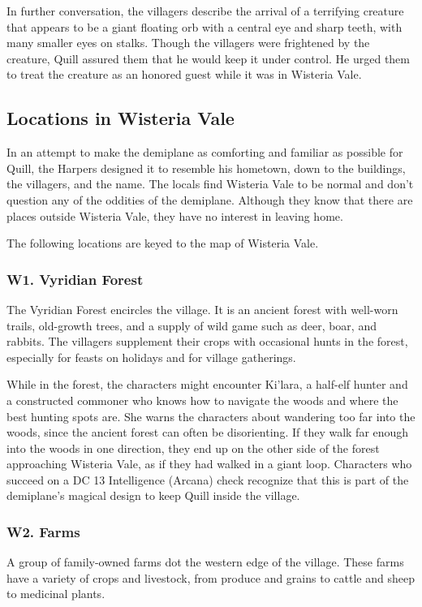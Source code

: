 \documentclass[10pt,a4paper,twoside,bg=print,twocolumn,openany,nodeprecatedcode]{dndbook}
\begin{document}
In further conversation, the villagers describe the arrival of a terrifying creature that appears to be a giant floating orb with a central eye and sharp teeth, with many smaller eyes on stalks. Though the villagers were frightened by the creature, Quill assured them that he would keep it under control. He urged them to treat the creature as an honored guest while it was in Wisteria Vale.

\subsection{Locations in Wisteria Vale}
In an attempt to make the demiplane as comforting and familiar as possible for Quill, the Harpers designed it to resemble his hometown, down to the buildings, the villagers, and the name. The locals find Wisteria Vale to be normal and don't question any of the oddities of the demiplane. Although they know that there are places outside Wisteria Vale, they have no interest in leaving home.

The following locations are keyed to the map of Wisteria Vale.

\subsubsection{W1. Vyridian Forest}
The Vyridian Forest encircles the village. It is an ancient forest with well-worn trails, old-growth trees, and a supply of wild game such as deer, boar, and rabbits. The villagers supplement their crops with occasional hunts in the forest, especially for feasts on holidays and for village gatherings.

While in the forest, the characters might encounter Ki'lara, a half-elf hunter and a constructed commoner who knows how to navigate the woods and where the best hunting spots are. She warns the characters about wandering too far into the woods, since the ancient forest can often be disorienting. If they walk far enough into the woods in one direction, they end up on the other side of the forest approaching Wisteria Vale, as if they had walked in a giant loop. Characters who succeed on a DC 13 Intelligence (Arcana) check recognize that this is part of the demiplane's magical design to keep Quill inside the village.

\subsubsection{W2. Farms}
A group of family-owned farms dot the western edge of the village. These farms have a variety of crops and livestock, from produce and grains to cattle and sheep to medicinal plants.
\end{document}
